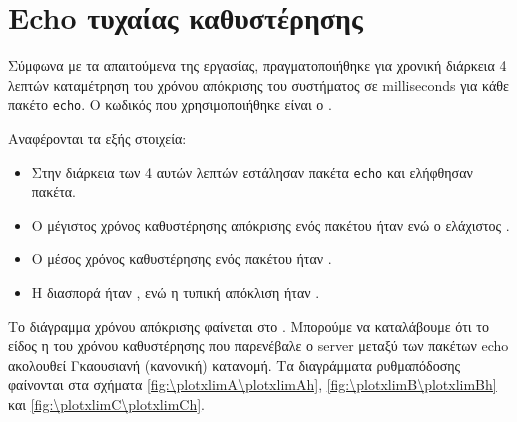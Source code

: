 \section{Echo τυχαίας καθυστέρησης}
Σύμφωνα με τα απαιτούμενα της εργασίας, πραγματοποιήθηκε για χρονική διάρκεια 4 λεπτών καταμέτρηση του χρόνου απόκρισης του συστήματος σε milliseconds για κάθε πακέτο \texttt{echo}.
Ο κωδικός που χρησιμοποιήθηκε είναι ο \echorequestcode{}.

Αναφέρονται τα εξής στοιχεία:
\begin{itemize}
\item Στην διάρκεια των 4 αυτών λεπτών εστάλησαν \echoxsend{} πακέτα \texttt{echo} και ελήφθησαν \echoxreceive{} πακέτα.
\item Ο μέγιστος χρόνος καθυστέρησης απόκρισης ενός πακέτου ήταν \maxechoxms{} ενώ ο ελάχιστος \minechoxms{}.
\item Ο μέσος χρόνος καθυστέρησης ενός πακέτου ήταν \meanechoxms{}.
\item Η διασπορά ήταν \varechoxms{}, ενώ η τυπική απόκλιση ήταν \stdechoxms{}.
\end{itemize}

Το διάγραμμα χρόνου απόκρισης φαίνεται στο \imageref{\plotxresponsetime\plotxhist}.
Μπορούμε να καταλάβουμε ότι το είδος η του χρόνου καθυστέρησης που παρενέβαλε ο server μεταξύ των πακέτων echo ακολουθεί Γκαουσιανή (κανονική) κατανομή.
Τα διαγράμματα ρυθμαπόδοσης φαίνονται στα σχήματα
\ref{fig:\plotxlimA\plotxlimAh},
\ref{fig:\plotxlimB\plotxlimBh}
και \ref{fig:\plotxlimC\plotxlimCh}.

\FloatBarrier
